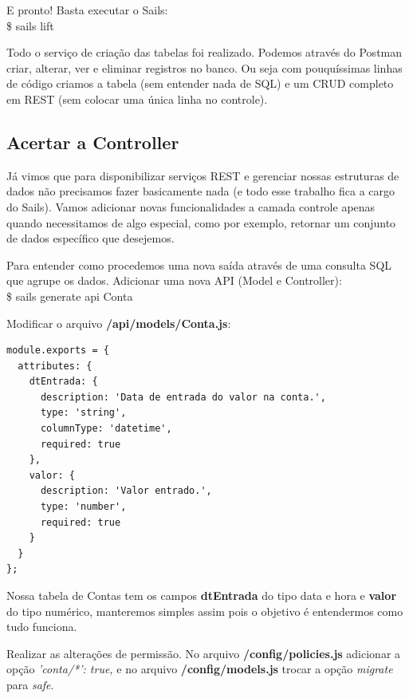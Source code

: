 \documentclass[a4paper,11pt]{article}
\begin{document}
E pronto! Basta executar o Sails: \\
{\ttfamily\$ sails lift}

Todo o serviço de criação das tabelas foi realizado. Podemos através do Postman criar, alterar, ver e eliminar registros no banco. Ou seja com pouquíssimas linhas de código criamos a tabela (sem entender nada de SQL) e um CRUD completo em REST (sem colocar uma única linha no controle).

\subsection{Acertar a Controller}
Já vimos que para disponibilizar serviços REST e gerenciar nossas estruturas de dados não precisamos fazer basicamente nada (e todo esse trabalho fica a cargo do Sails). Vamos adicionar novas funcionalidades a camada controle apenas quando necessitamos de algo especial, como por exemplo, retornar um conjunto de dados específico que desejemos.

Para entender como procedemos uma nova saída através de uma consulta SQL que agrupe os dados. Adicionar uma nova API (Model e Controller): \\
{\ttfamily\$ sails generate api Conta}

Modificar o arquivo \textbf{/api/models/Conta.js}:
\begin{lstlisting}
module.exports = {
  attributes: {
    dtEntrada: {
      description: 'Data de entrada do valor na conta.',
      type: 'string',
      columnType: 'datetime',
      required: true
    },
    valor: {
      description: 'Valor entrado.',
      type: 'number',
      required: true
    }
  }
};
\end{lstlisting}

Nossa tabela de Contas tem os campos \textbf{dtEntrada} do tipo data e hora e \textbf{valor} do tipo numérico, manteremos simples assim pois o objetivo é entendermos como tudo funciona. 

Realizar as alterações de permissão. No arquivo \textbf{/config/policies.js} adicionar a opção \textit{'conta/*': true,} e no arquivo \textbf{/config/models.js} trocar a opção \textit{migrate} para \textit{safe}.
\end{document}
